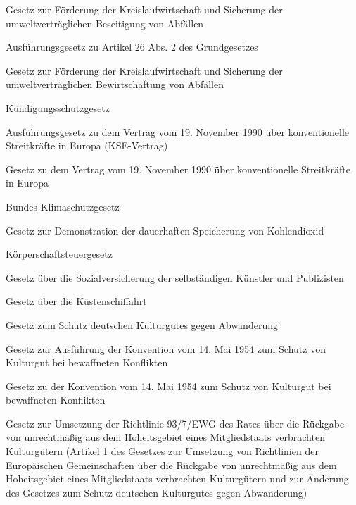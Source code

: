 \item[{KrW--AbfG}] Gesetz zur Förderung der Kreislaufwirtschaft und Sicherung der umweltverträglichen Beseitigung von Abfällen

\item[{KrWaffKontrG}] Ausführungsgesetz zu Artikel 26 Abs. 2 des Grundgesetzes

\item[{KrWG}] Gesetz zur Förderung der Kreislaufwirtschaft und Sicherung der umweltverträglichen Bewirtschaftung von Abfällen

\item[{KSchG}] Kündigungsschutzgesetz

\item[{KSEVtrAG}] Ausführungsgesetz zu dem Vertrag vom 19. November 1990 über konventionelle Streitkräfte in Europa (KSE-Vertrag)

\item[{KSEVtrG}] Gesetz zu dem Vertrag vom 19. November 1990 über konventionelle Streitkräfte in Europa

\item[{KSG}] Bundes-Klimaschutzgesetz

\item[{KSpG}] Gesetz zur Demonstration der dauerhaften Speicherung von Kohlendioxid

\item[{KStG-1977}] Körperschaftsteuergesetz

\item[{KSVG}] Gesetz über die Sozialversicherung der selbständigen Künstler und Publizisten

\item[{KüSchG}] Gesetz über die Küstenschiffahrt

\item[{KultgSchG}] Gesetz zum Schutz deutschen Kulturgutes gegen Abwanderung

\item[{KultgSchKonvAG}] Gesetz zur Ausführung der Konvention vom 14. Mai 1954 zum Schutz von Kulturgut bei bewaffneten Konflikten

\item[{KultgSchKonvG}] Gesetz zu der Konvention vom 14. Mai 1954 zum Schutz von Kulturgut bei bewaffneten Konflikten

\item[{KultGüRückG}] Gesetz zur Umsetzung der Richtlinie 93/7/EWG des Rates über die Rückgabe von unrechtmäßig aus dem Hoheitsgebiet eines Mitgliedstaats verbrachten Kulturgütern (Artikel 1 des Gesetzes zur Umsetzung von Richtlinien der Europäischen Gemeinschaften über die Rückgabe von unrechtmäßig aus dem Hoheitsgebiet eines Mitgliedstaats verbrachten Kulturgütern und zur Änderung des Gesetzes zum Schutz deutschen Kulturgutes gegen Abwanderung)

